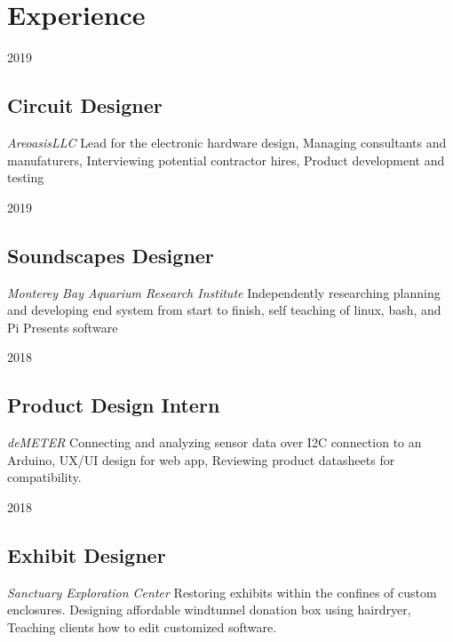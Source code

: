 \documentclass[12pt,letterpaper]{report}
\newcommand{\middlegap}{4.5em}
\newcommand{\verticalgap}{2em}
\newcommand{\leftbody}{0.69\linewidth}
\begin{document}
	\begin{minipage}[t]{\leftbody}
		\vspace{\verticalgap}
	\raggedright
    \section*{Experience}
    \begin{tablist}
    \item[2019] \tab 
    \subsection*{Circuit Designer}
    \textit{AreoasisLLC} \linebreak 
	Lead for the electronic hardware design, Managing consultants and manufaturers, Interviewing potential contractor hires, Product development and testing
    \item[2019] \tab
    \subsection*{Soundscapes Designer}
    \textit{Monterey Bay Aquarium Research Institute} \linebreak 
    Independently researching planning and developing end system from start to finish, self teaching of linux, bash, and Pi Presents software
    \item[2018] \tab
    \subsection*{Product Design Intern}
    \textit{deMETER} \linebreak 
    Connecting and analyzing sensor data over I2C connection to an Arduino, UX/UI design for web app, Reviewing product datasheets for compatibility. 
    \item[2018] \tab 
    \subsection*{Exhibit Designer}
	\textit{Sanctuary Exploration Center} \linebreak
	Restoring exhibits within the confines of custom enclosures. Designing affordable windtunnel donation box using hairdryer, Teaching clients how to edit customized software.
    \end{tablist}
	\end{minipage}
	\hspace{\middlegap}
% 
\end{document}
